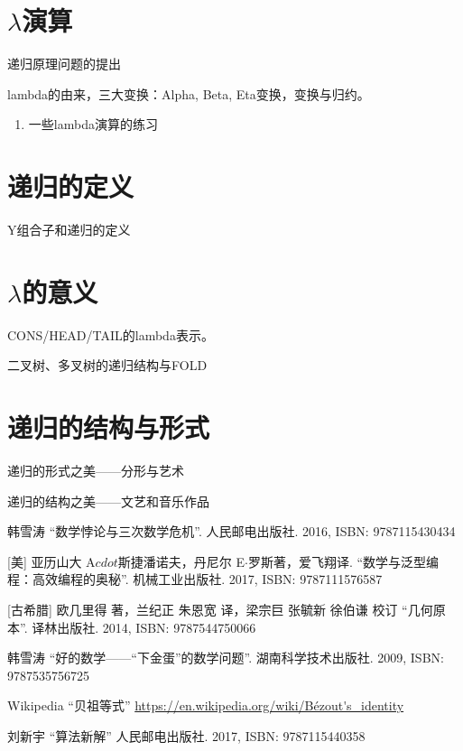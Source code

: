 \documentclass[UTF8]{article}
\begin{document}
\section{$\lambda$演算}

递归原理问题的提出

lambda的由来，三大变换：Alpha, Beta, Eta变换，变换与归约。


\begin{Exercise}
\begin{enumerate}
\item 一些lambda演算的练习
\end{enumerate}
\end{Exercise}

\section{递归的定义}

Y组合子和递归的定义

\section{$\lambda$的意义}

CONS/HEAD/TAIL的lambda表示。

二叉树、多叉树的递归结构与FOLD

\section{递归的结构与形式}

递归的形式之美——分形与艺术

递归的结构之美——文艺和音乐作品

\ifx\wholebook\relax \else
\begin{thebibliography}{99}

韩雪涛 ``数学悖论与三次数学危机''. 人民邮电出版社. 2016, ISBN: 9787115430434

[美] 亚历山大 A$cdot$斯捷潘诺夫，丹尼尔 E$\cdot$罗斯著，爱飞翔译. ``数学与泛型编程：高效编程的奥秘''. 机械工业出版社. 2017, ISBN: 9787111576587

[古希腊] 欧几里得 著，兰纪正 朱恩宽 译，梁宗巨 张毓新 徐伯谦 校订 ``几何原本''. 译林出版社. 2014, ISBN: 9787544750066

韩雪涛 ``好的数学——“下金蛋”的数学问题''. 湖南科学技术出版社. 2009, ISBN: 9787535756725

Wikipedia ``贝祖等式'' \url{https://en.wikipedia.org/wiki/Bézout's_identity}

刘新宇 ``算法新解'' 人民邮电出版社. 2017, ISBN: 9787115440358

\end{thebibliography}

\expandafter\enddocument

\fi
\end{document}
